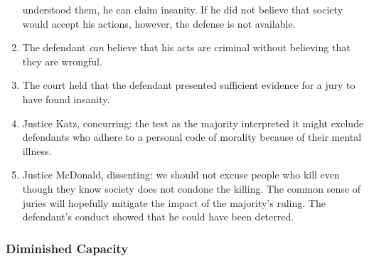 \begin{enumerate}
    understood them, he can claim insanity. If he did not believe that society 
    would accept his actions, however, the defense is not available.
    \item The defendant \emph{can} believe that his acts are criminal without 
    believing that they are wrongful.
    \item The court held that the defendant presented sufficient evidence for 
    a jury to have found insanity.
    \item Justice Katz, concurring: the test as the majority interpreted it 
    might exclude defendants who adhere to a personal code of morality because 
    of their mental illness.
    \item Justice McDonald, dissenting: we should not excuse people who kill 
    even though they know society does not condone the killing. The common 
    sense of juries will hopefully mitigate the impact of the majority's 
    ruling. The defendant's conduct showed that he could have been deterred.
\end{enumerate}

\subsubsection{Diminished Capacity}

